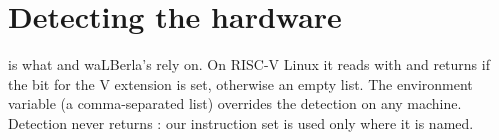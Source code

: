 \section{Detecting the hardware}\label{r04:sec:detect}

 is what  and waLBerla's
 rely on. On RISC-V Linux it reads  with
 and returns \code{['rvv']} if the bit for the V extension is set,
otherwise an empty list. The environment variable  (a
comma-separated list) overrides the detection on any machine. Detection never returns
: our instruction set is used only where it is named.
